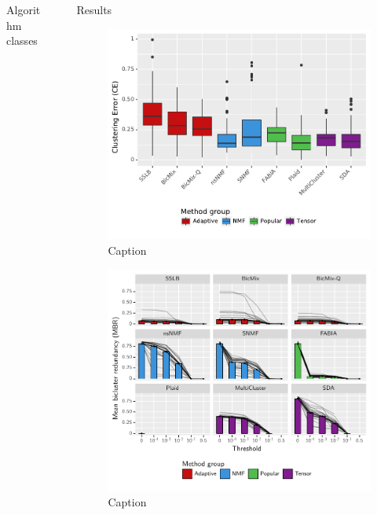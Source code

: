 \documentclass[final]{beamer}
\newlength{\sepwid}
\newlength{\onecolwid}
\begin{document}
\begin{frame}[t]
\begin{columns}[t]
\begin{column}{\onecolwid}
\begin{block}{Algorithm classes}
\end{block}

\end{column} %

\begin{column}{\sepwid}\end{column} %

\begin{column}{\onecolwid} %


\begin{block}{Results}

\begin{figure}
\includegraphics[width=0.9 \textwidth]{plots/summary_clust_err_best_theoretical_K_init.pdf}
\caption{Caption}
\end{figure}

\begin{figure}
\includegraphics[width=0.9 \textwidth]{plots/threshold_adjusted_redundancy_mean_lines.pdf}
\caption{Caption}
\end{figure}


\end{block}
\end{column}
\end{columns}
\end{frame}
\end{document}
